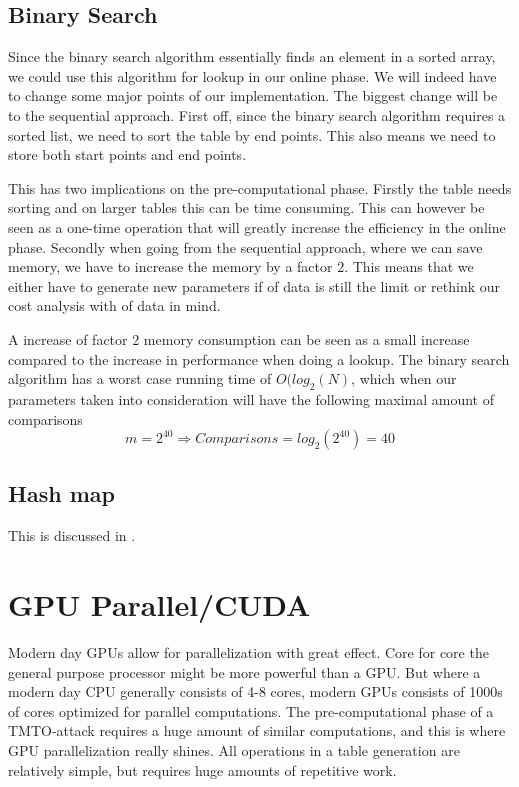 \subsection{Binary Search}

Since the binary search algorithm essentially finds an element in a
sorted array, we could use this algorithm for lookup in our
online phase. We will indeed have to change some major points of our
implementation. The biggest change will be to the sequential
approach. First off, since the binary search algorithm requires a
sorted list, we need to sort the table by end points. This also means
we need to store both start points and end points.

This has two implications on the pre-computational phase. Firstly the table
needs sorting and on larger tables this can be time consuming. This
can however be seen as a one-time operation that will greatly increase
the efficiency in the online phase. Secondly when going from the
sequential approach, where we can save memory, we have to 
increase the memory by a factor 2. This means that we either have to
generate new parameters if  of data is still the limit or
rethink our cost analysis with  of data in mind.

A increase of factor 2 memory consumption can be seen as a small
increase compared to the increase in performance when doing a
lookup. The binary search algorithm has a worst case running time of
$O(log_2(N)$, which when our parameters taken into consideration will
have the following maximal amount of comparisons
\[m  = 2^{40} \Rightarrow Comparisons = log_2(2^{40}) = 40\]
\subsection{Hash map}

This is discussed in \cite[Appendix D]{176}.

\section{GPU Parallel/CUDA}

Modern day GPUs allow for parallelization with great effect. Core for
core the general purpose processor might be more powerful than a GPU.
But where a modern day CPU generally consists of 4-8 cores, modern
GPUs consists of 1000s of cores optimized for parallel
computations. The pre-computational phase of a TMTO-attack requires a
huge amount of similar computations, and this is where GPU
parallelization really shines. All operations in a table generation
are relatively simple, but requires huge amounts of repetitive work. 

